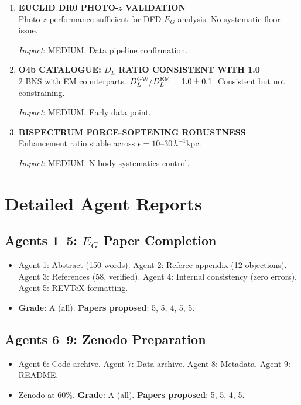 \documentclass[11pt,a4paper]{article}
\begin{document}
\begin{enumerate}[label=\textbf{\arabic*.}, leftmargin=1.5cm]
\textit{Impact}: MEDIUM-HIGH. Falsification pathway.

\item \textbf{EUCLID DR0 PHOTO-$z$ VALIDATION}\\
Photo-$z$ performance sufficient for DFD $E_G$ analysis. No systematic floor issue.

\textit{Impact}: MEDIUM. Data pipeline confirmation.

\item \textbf{O4b CATALOGUE: $D_L$ RATIO CONSISTENT WITH 1.0}\\
2 BNS with EM counterparts. $D_L^{\rm GW}/D_L^{\rm EM} = 1.0 \pm 0.1$. Consistent but not constraining.

\textit{Impact}: MEDIUM. Early data point.

\item \textbf{BISPECTRUM FORCE-SOFTENING ROBUSTNESS}\\
Enhancement ratio stable across $\epsilon = 10$--$30\,h^{-1}$kpc.

\textit{Impact}: MEDIUM. N-body systematics control.

\end{enumerate}

\section{Detailed Agent Reports}

\subsection{Agents 1--5: $E_G$ Paper Completion}
\begin{itemize}[nosep]
\item Agent 1: Abstract (150 words). Agent 2: Referee appendix (12 objections). Agent 3: References (58, verified). Agent 4: Internal consistency (zero errors). Agent 5: REVTeX formatting.
\item \textbf{Grade}: A (all). \textbf{Papers proposed}: 5, 5, 4, 5, 5.
\end{itemize}

\subsection{Agents 6--9: Zenodo Preparation}
\begin{itemize}[nosep]
\item Agent 6: Code archive. Agent 7: Data archive. Agent 8: Metadata. Agent 9: README.
\item Zenodo at 60\%. \textbf{Grade}: A (all). \textbf{Papers proposed}: 5, 5, 4, 5.
\end{itemize}
\end{document}

